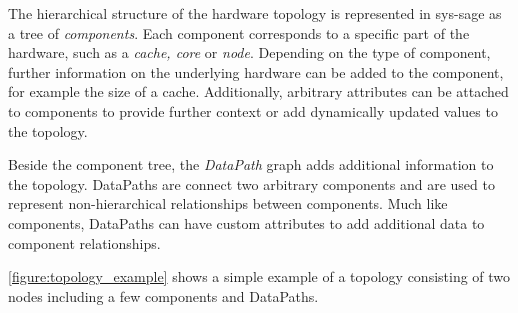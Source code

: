 The hierarchical structure of the hardware topology is represented in sys-sage as a tree of \emph{components}.
Each component corresponds to a specific part of the hardware, such as a \emph{cache, core} or \emph{node}.
Depending on the type of component, further information on the underlying hardware can be added to the component, for example the size of a cache.
Additionally, arbitrary attributes can be attached to components to provide further context or add dynamically updated values to the topology.

Beside the component tree, the \emph{DataPath} graph adds additional information to the topology.
DataPaths are connect two arbitrary components and are used to represent non-hierarchical relationships between components.
Much like components, DataPaths can have custom attributes to add additional data to component relationships.

\autoref{figure:topology_example} shows a simple example of a topology consisting of two nodes including a few components and DataPaths.